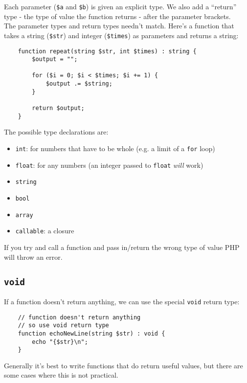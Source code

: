 Each parameter (\texttt{\$a} and \texttt{\$b}) is given an explicit type. We also add a ``return'' type - the type of value the function returns - after the parameter brackets.
\\

The parameter types and return types needn't match. Here's a function that takes a string (\texttt{\$str}) and integer (\texttt{\$times}) as parameters and returns a string:

\begin{verbatim}
    function repeat(string $str, int $times) : string {
        $output = "";

        for ($i = 0; $i < $times; $i += 1) {
            $output .= $string;
        }

        return $output;
    }
\end{verbatim}

The possible type declarations are:

\begin{itemize}
    \item \texttt{int}: for numbers that have to be whole (e.g. a limit of a \texttt{for} loop)
    \item \texttt{float}: for any numbers (an integer passed to \texttt{float} \textit{will} work)
    \item \texttt{string}
    \item \texttt{bool}
    \item \texttt{array}
    \item \texttt{callable}: a closure
\end{itemize}

If you try and call a function and pass in/return the wrong type of value PHP will throw an error.


\subsection{\texttt{void}}

If a function doesn't return anything, we can use the special \texttt{void} return type:

\begin{verbatim}
    // function doesn't return anything
    // so use void return type
    function echoNewLine(string $str) : void {
        echo "{$str}\n";
    }
\end{verbatim}

Generally it's best to write functions that do return useful values, but there are some cases where this is not practical.


